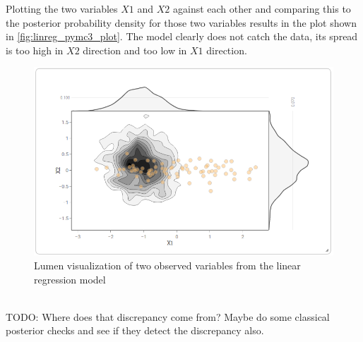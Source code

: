 \documentclass{article}
\begin{document}
Plotting the two variables $X1$ and $X2$ against each other and comparing this to the posterior probability density for those two variables results in the plot shown in \autoref{fig:linreg_pymc3_plot}. The model clearly does not catch the data, its spread is too high in $X2$ direction and too low in $X1$ direction.
\begin{figure}
	\includegraphics[width=\textwidth]{images/linreg_pymc3_plot.png}
	\caption[Lumen visualization of two observed variables from the linear regression model]{Lumen visualization of two observed variables from the linear regression model}
	\label{fig:linreg_pymc3_plot}
\end{figure}
\\
TODO: Where does that discrepancy come from? Maybe do some classical posterior checks and see if they detect the discrepancy also.
\end{document}
